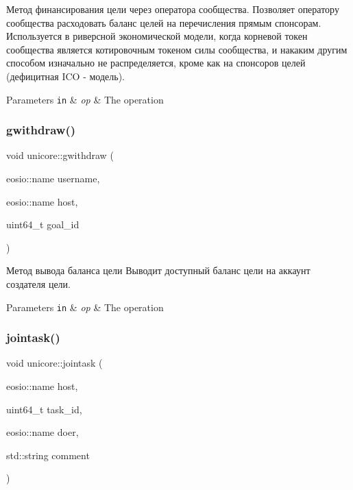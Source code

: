 Метод финансирования цели через оператора сообщества. Позволяет оператору сообщества расходовать баланс целей на перечисления прямым спонсорам. Используется в риверсной экономической модели, когда корневой токен сообщества является котировочным токеном силы сообщества, и накаким другим способом изначально не распределяется, кроме как на спонсоров целей (дефицитная I\+CO -\/ модель). 


\begin{DoxyParams}[1]{Parameters}
\mbox{\tt in}  & {\em op} & The operation \\
\hline
\end{DoxyParams}
\mbox{\label{classunicore_a4faa41a68505840e66f78e350412723c}} 
\subsubsection{\texorpdfstring{gwithdraw()}{gwithdraw()}}
{\footnotesize\ttfamily void unicore\+::gwithdraw (\begin{DoxyParamCaption}\item[{eosio\+::name}]{username,  }\item[{eosio\+::name}]{host,  }\item[{uint64\+\_\+t}]{goal\+\_\+id }\end{DoxyParamCaption})}



Метод вывода баланса цели Выводит доступный баланс цели на аккаунт создателя цели. 


\begin{DoxyParams}[1]{Parameters}
\mbox{\tt in}  & {\em op} & The operation \\
\hline
\end{DoxyParams}
\mbox{\label{classunicore_a799e41649cd9bab8a1a9a9c41822925b}} 
\subsubsection{\texorpdfstring{jointask()}{jointask()}}
{\footnotesize\ttfamily void unicore\+::jointask (\begin{DoxyParamCaption}\item[{eosio\+::name}]{host,  }\item[{uint64\+\_\+t}]{task\+\_\+id,  }\item[{eosio\+::name}]{doer,  }\item[{std\+::string}]{comment }\end{DoxyParamCaption})}



